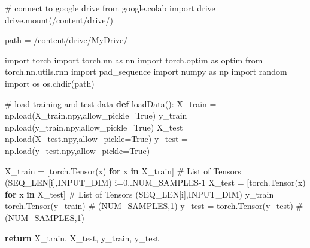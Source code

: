 \documentclass[
  letterpaper,
  DIV=11,
  numbers=noendperiod]{scrartcl}
\newenvironment{Shaded}{\begin{snugshade}}{\end{snugshade}}
\newcommand{\CommentTok}[1]{\textcolor[rgb]{0.37,0.37,0.37}{#1}}
\newcommand{\ControlFlowTok}[1]{\textcolor[rgb]{0.00,0.23,0.31}{\textbf{#1}}}
\newcommand{\ImportTok}[1]{\textcolor[rgb]{0.00,0.46,0.62}{#1}}
\newcommand{\KeywordTok}[1]{\textcolor[rgb]{0.00,0.23,0.31}{\textbf{#1}}}
\newcommand{\NormalTok}[1]{\textcolor[rgb]{0.00,0.23,0.31}{#1}}
\newcommand{\OperatorTok}[1]{\textcolor[rgb]{0.37,0.37,0.37}{#1}}
\newcommand{\StringTok}[1]{\textcolor[rgb]{0.13,0.47,0.30}{#1}}
\newcommand{\VariableTok}[1]{\textcolor[rgb]{0.07,0.07,0.07}{#1}}
\begin{document}
\begin{Shaded}
\begin{Highlighting}[]
\CommentTok{\# connect to google drive}
\ImportTok{from}\NormalTok{ google.colab }\ImportTok{import}\NormalTok{ drive}
\NormalTok{drive.mount(}\StringTok{\textquotesingle{}/content/drive/\textquotesingle{}}\NormalTok{)}

\NormalTok{path }\OperatorTok{=} \StringTok{\textquotesingle{}/content/drive/MyDrive/\textquotesingle{}}

\ImportTok{import}\NormalTok{ torch}
\ImportTok{import}\NormalTok{ torch.nn }\ImportTok{as}\NormalTok{ nn}
\ImportTok{import}\NormalTok{ torch.optim }\ImportTok{as}\NormalTok{ optim}
\ImportTok{from}\NormalTok{ torch.nn.utils.rnn }\ImportTok{import}\NormalTok{ pad\_sequence}
\ImportTok{import}\NormalTok{ numpy }\ImportTok{as}\NormalTok{ np}
\ImportTok{import}\NormalTok{ random}
\ImportTok{import}\NormalTok{ os}
\NormalTok{os.chdir(path)}


\CommentTok{\# load training and test data}
\KeywordTok{def}\NormalTok{ loadData():}
\NormalTok{    X\_train }\OperatorTok{=}\NormalTok{ np.load(}\StringTok{\textquotesingle{}X\_train.npy\textquotesingle{}}\NormalTok{,allow\_pickle}\OperatorTok{=}\VariableTok{True}\NormalTok{)}
\NormalTok{    y\_train }\OperatorTok{=}\NormalTok{ np.load(}\StringTok{\textquotesingle{}y\_train.npy\textquotesingle{}}\NormalTok{,allow\_pickle}\OperatorTok{=}\VariableTok{True}\NormalTok{)}
\NormalTok{    X\_test }\OperatorTok{=}\NormalTok{ np.load(}\StringTok{\textquotesingle{}X\_test.npy\textquotesingle{}}\NormalTok{,allow\_pickle}\OperatorTok{=}\VariableTok{True}\NormalTok{)}
\NormalTok{    y\_test }\OperatorTok{=}\NormalTok{ np.load(}\StringTok{\textquotesingle{}y\_test.npy\textquotesingle{}}\NormalTok{,allow\_pickle}\OperatorTok{=}\VariableTok{True}\NormalTok{)}

\NormalTok{    X\_train }\OperatorTok{=}\NormalTok{ [torch.Tensor(x) }\ControlFlowTok{for}\NormalTok{ x }\KeywordTok{in}\NormalTok{ X\_train]  }\CommentTok{\# List of Tensors (SEQ\_LEN[i],INPUT\_DIM) i=0..NUM\_SAMPLES{-}1}
\NormalTok{    X\_test }\OperatorTok{=}\NormalTok{ [torch.Tensor(x) }\ControlFlowTok{for}\NormalTok{ x }\KeywordTok{in}\NormalTok{ X\_test]  }\CommentTok{\# List of Tensors (SEQ\_LEN[i],INPUT\_DIM)}
\NormalTok{    y\_train }\OperatorTok{=}\NormalTok{ torch.Tensor(y\_train) }\CommentTok{\# (NUM\_SAMPLES,1)}
\NormalTok{    y\_test }\OperatorTok{=}\NormalTok{ torch.Tensor(y\_test) }\CommentTok{\# (NUM\_SAMPLES,1)}

    \ControlFlowTok{return}\NormalTok{ X\_train, X\_test, y\_train, y\_test}



\end{Highlighting}
\end{Shaded}
\end{document}
